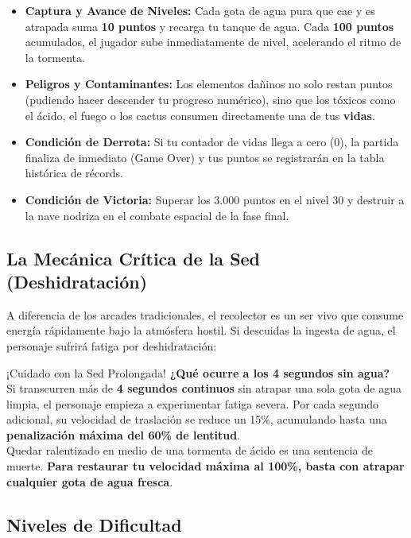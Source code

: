 \documentclass[11pt,a4paper]{article}
\begin{document}
\begin{itemize}[itemsep=0.6em]
    \item \textbf{Captura y Avance de Niveles:} Cada gota de agua pura que cae y es atrapada suma \textbf{10 puntos} y recarga tu tanque de agua. Cada \textbf{100 puntos} acumulados, el jugador sube inmediatamente de nivel, acelerando el ritmo de la tormenta.
    \item \textbf{Peligros y Contaminantes:} Los elementos dañinos no solo restan puntos (pudiendo hacer descender tu progreso numérico), sino que los tóxicos como el ácido, el fuego o los cactus consumen directamente una de tus \textbf{vidas}.
    \item \textbf{Condición de Derrota:} Si tu contador de vidas llega a cero ($0$), la partida finaliza de inmediato (Game Over) y tus puntos se registrarán en la tabla histórica de récords.
    \item \textbf{Condición de Victoria:} Superar los 3.000 puntos en el nivel 30 y destruir a la nave nodriza en el combate espacial de la fase final.
\end{itemize}

\subsection*{La Mecánica Crítica de la Sed (Deshidratación)}

A diferencia de los arcades tradicionales, el recolector es un ser vivo que consume energía rápidamente bajo la atmósfera hostil. Si descuidas la ingesta de agua, el personaje sufrirá fatiga por deshidratación:

\begin{alerta}{¡Cuidado con la Sed Prolongada!}
    \textbf{¿Qué ocurre a los 4 segundos sin agua?} \\
    Si transcurren más de \textbf{4 segundos continuos} sin atrapar una sola gota de agua limpia, el personaje empieza a experimentar fatiga severa. Por cada segundo adicional, su velocidad de traslación se reduce un 15\%, acumulando hasta una \textbf{penalización máxima del 60\% de lentitud}. \\
    Quedar ralentizado en medio de una tormenta de ácido es una sentencia de muerte. \textbf{Para restaurar tu velocidad máxima al 100\%, basta con atrapar cualquier gota de agua fresca}.
\end{alerta}

\subsection*{Niveles de Dificultad}
\end{document}
